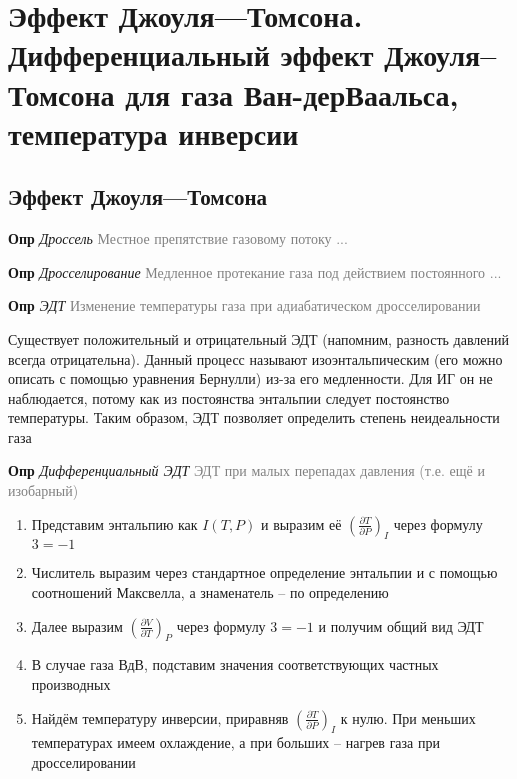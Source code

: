 \documentclass[a4paper, 14pt]{article}
\begin{document}
    \section{Эффект Джоуля—Томсона.
    Дифференциальный эффект Джоуля–Томсона для газа Ван-дерВаальса, температура инверсии}

    \subsection{Эффект Джоуля—Томсона}

    \textbf{Опр} \textit{Дроссель} \textcolor{gray}{Местное препятствие газовому потоку ...}

    \textbf{Опр} \textit{Дросселирование} \textcolor{gray}{Медленное протекание газа под действием постоянного ...}

    \textbf{Опр} \textit{ЭДТ} \textcolor{gray}{Изменение температуры газа при адиабатическом дросселировании}

    Существует положительный и отрицательный ЭДТ (напомним, разность давлений всегда отрицательна).
    Данный процесс называют изоэнтальпическим (его можно описать с помощью уравнения Бернулли) из-за его медленности.
    Для ИГ он не наблюдается, потому как из постоянства энтальпии следует постоянство температуры.
    Таким образом, ЭДТ позволяет определить степень неидеальности газа

    \textbf{Опр} \textit{Дифференциальный ЭДТ} \textcolor{gray}{ЭДТ при малых перепадах давления (т.е. ещё и изобарный)}

    \begin{enumerate}
        \item Представим энтальпию как $I(T, P)$ и выразим её $(\frac{\partial T}{\partial P})_I$ через формулу $3 = -1$
        \item Числитель выразим через стандартное определение энтальпии и с помощью соотношений Максвелла, а
        знаменатель -- по определению
        \item Далее выразим $(\frac{\partial V}{\partial T})_P$ через формулу $3 = -1$ и получим общий вид ЭДТ
        \item В случае газа ВдВ, подставим значения соответствующих частных производных
        \item Найдём температуру инверсии, приравняв $(\frac{\partial T}{\partial P})_I$ к нулю.
        При меньших температурах имеем охлаждение, а при больших -- нагрев газа при дросселировании
    \end{enumerate}
\end{document}
